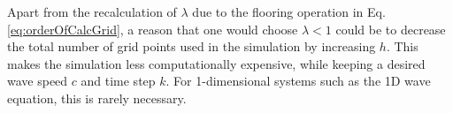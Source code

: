 Apart from the recalculation of $\lambda$ due to the flooring operation in Eq. \eqref{eq:orderOfCalcGrid}, a reason that one would choose $\lambda < 1$ could be to decrease the total number of grid points used in the simulation by increasing $h$. This makes the simulation less computationally expensive, while keeping a desired wave speed $c$ and time step $k$. For 1-dimensional systems such as the 1D wave equation, this is rarely necessary.
